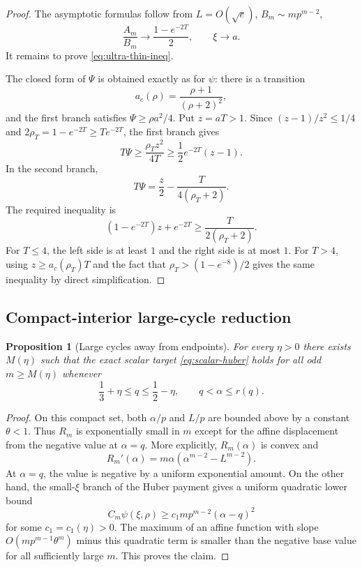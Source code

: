 \documentclass[11pt]{article}
\newtheorem{proposition}[theorem]{Proposition}
\begin{document}
\begin{proof}
The asymptotic formulas follow from $L=O(\sqrt e)$,
$B_m\sim mp^{m-2}$,
\[
        \frac{A_m}{B_m}\to\frac{1-e^{-2T}}2,
        \qquad
        \xi\to a.
\]
It remains to prove \eqref{eq:ultra-thin-ineq}.

The closed form of $\Psi$ is obtained exactly as for $\psi$:
there is a transition
\[
        a_c(\rho)=\frac{\rho+1}{(\rho+2)^2},
\]
and the first branch satisfies $\Psi\ge\rho a^2/4$.  Put $z=aT>1$.
Since $(z-1)/z^2\le1/4$ and
$2\rho_T=1-e^{-2T}\ge T e^{-2T}$, the first branch gives
\[
        T\Psi\ge\frac{\rho_Tz^2}{4T}
        \ge\frac12e^{-2T}(z-1).
\]
In the second branch,
\[
        T\Psi=\frac z2-\frac{T}{4(\rho_T+2)}.
\]
The required inequality is
\[
        (1-e^{-2T})z+e^{-2T}\ge\frac{T}{2(\rho_T+2)}.
\]
For $T\le4$, the left side is at least $1$ and the right side is at most
$1$.  For $T>4$, using $z\ge a_c(\rho_T)T$ and the fact that
$\rho_T>(1-e^{-8})/2$ gives the same inequality by direct simplification.
\end{proof}

\subsection{Compact-interior large-cycle reduction}

\begin{proposition}[Large cycles away from endpoints]\label{prop:compact-tail}
For every $\eta>0$ there exists $M(\eta)$ such that the exact scalar target
\eqref{eq:scalar-huber} holds for all odd $m\ge M(\eta)$ whenever
\[
        \frac13+\eta\le q\le\frac12-\eta,
        \qquad
        q<\alpha\le r(q).
\]
\end{proposition}

\begin{proof}
On this compact set, both $\alpha/p$ and $L/p$ are bounded above by a
constant $\theta<1$.  Thus $R_m$ is exponentially small in $m$ except for
the affine displacement from the negative value at $\alpha=q$.  More
explicitly, $R_m(\alpha)$ is convex and
\[
        R_m'(\alpha)=m\alpha(\alpha^{m-2}-L^{m-2}).
\]
At $\alpha=q$, the value is negative by a uniform exponential amount.  On
the other hand, the small-$\xi$ branch of the Huber payment gives a
uniform quadratic lower bound
\[
        C_m\psi(\xi,\rho)\ge c_1mp^{m-2}(\alpha-q)^2
\]
for some $c_1=c_1(\eta)>0$.  The maximum of an affine function with slope
$O(mp^{m-1}\theta^{m})$ minus this quadratic term is smaller than the
negative base value for all sufficiently large $m$.  This proves the
claim.
\end{proof}
\end{document}
